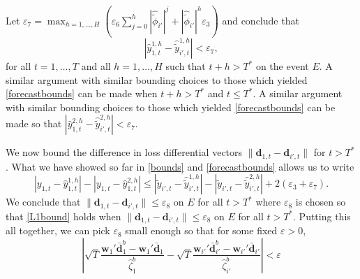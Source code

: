 \documentclass[11pt]{article}
\newcommand{\R}{\mathbb{R}}
\newcommand{\dbf}{\textbf{d}}
\theoremstyle{definition}
\begin{document}
Let $\varepsilon_7 = \max_{h = 1,\ldots,H}\left(\varepsilon_6 \sum_{j=0}^h |\hat{\tilde{\phi}}_{i'}|^j + |\hat{\tilde{\phi}}_{i'}|^h\varepsilon_3\right)$ 
and conclude that 
\begin{equation} \label{forecastbounds}
  |\hat{y}_{1,t}^{1,h} - \hat{\tilde{y}}_{i',t}^{1,h}| < \varepsilon_7,	
\end{equation}
for all $t = 1,\ldots,T$ and all $h=1,\ldots,H$ such that $t+h > T^*$ on the event $E$. A similar argument with similar bounding choices to those which yielded \eqref{forecastbounds} can be made when $t+h > T^*$ and $t \leq T^*$. A similar argument with similar bounding choices to those which yielded \eqref{forecastbounds} can be made so that $|\hat{y}_{1,t}^{2,h} - \hat{\tilde{y}}_{i',t}^{2,h}| < \varepsilon_7$.

We now bound the difference in loss differential vectors $\|\dbf_{1,t} - \dbf_{i',t}\|$ for $t > T^*$. What we have showed so far in \eqref{bounds} and \eqref{forecastbounds} allows us to write
\begin{equation} \label{L1bound}
  |y_{1,t} - \hat{y}^{1,h}_{1,t}| - |y_{1,t} - \hat{y}^{2,h}_{1,t}| \leq |\tilde{y}_{i',t} - \hat{\tilde{y}}^{1,h}_{i',t}| - |\tilde{y}_{i',t} - \hat{\tilde{y}}^{2,h}_{i',t}| + 2(\varepsilon_3 + \varepsilon_7).
\end{equation}
We conclude that $\|\dbf_{1,t} - \dbf_{i',t}\| \leq \varepsilon_8$ on $E$ for all $t > T^*$ where $\varepsilon_8$ is chosen so that \eqref{L1bound} holds when $\|\dbf_{1,t} - \dbf_{i',t}\| \leq \varepsilon_8$ on $E$ for all $t > T^*$.
Putting this all together, we can pick $\varepsilon_8$ small enough so that for some fixed $\varepsilon > 0$,
\begin{equation} \label{testbounds}
   \left|\sqrt{T}\frac{\textbf{w}_1'\bar{\dbf}_1^b - \textbf{w}_1'\bar{\dbf}_1}{\hat{\zeta}^b_1} - \sqrt{T}\frac{\textbf{w}_{i'}'\bar{\dbf}_{i'}^b - \textbf{w}_{i'}'\bar{\dbf}_{i'}}{\hat{\zeta}^b_{i'}}\right| < \varepsilon	
\end{equation}
\end{document}
